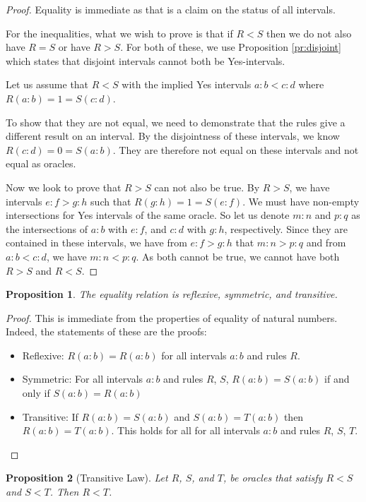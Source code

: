 \documentclass[12pt]{article}
\newtheorem{proposition}{Proposition}
\theoremstyle{remark}
\begin{document}
\begin{proof}
Equality is immediate as that is a claim on the status of all intervals. 

For the inequalities, what we wish to prove is that if $R < S$ then we do not also have $R=S$ or have $R > S$. For both of these, we use Proposition \ref{pr:disjoint} which states that disjoint intervals cannot both be Yes-intervals. 

Let us assume that $R<S$ with the implied Yes intervals $a:b < c:d$ where $R(a:b)=1 =S(c:d)$.

To show that they are not equal, we need to demonstrate that the rules give a different result on an interval. By the disjointness of these intervals, we know  $R(c:d) = 0 = S(a:b)$. They are therefore not equal on these intervals and not equal as oracles.  

Now we look to prove that $R>S$ can not also be true. By $R > S$, we have intervals $e:f > g:h$ such that $R(g:h) = 1 = S(e:f)$. We must have non-empty intersections for Yes intervals of the same oracle. So let us denote $m:n$ and $p:q$ as the intersections of $a:b$ with $e:f$, and $c:d$ with $g:h$, respectively. Since they are contained in these intervals, we have from $e:f > g:h$ that $m:n > p:q$ and from $a:b < c:d$, we have $m:n < p:q$. As both cannot be true, we cannot have both $R>S$ and $R<S$. 
\end{proof}

\begin{proposition}\label{pr:reflexive}
The equality relation is reflexive, symmetric, and transitive. 
\end{proposition}

\begin{proof}
This is immediate from the properties of equality of natural numbers. Indeed, the statements of these are the proofs:
\begin{itemize}
    \item Reflexive: $R(a:b)=R(a:b)$ for all intervals $a:b$ and rules $R$.
    \item Symmetric: For all intervals $a:b$ and rules $R$, $S$, $R(a:b)=S(a:b)$ if and only if $S(a:b) = R(a:b)$ 
    \item Transitive: If $R(a:b)=S(a:b)$ and $S(a:b) = T(a:b)$ then $R(a:b)=T(a:b)$. This holds for all for all intervals $a:b$ and rules $R$, $S$, $T$.
\end{itemize}
\end{proof}

\begin{proposition}[Transitive Law]\label{pr:transitive}
Let $R$, $S$, and $T$, be oracles that satisfy $R<S$ and $S < T$. Then $R < T$.
\end{proposition}
\end{document}
